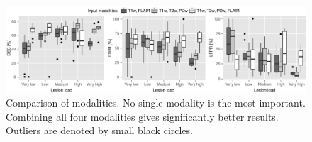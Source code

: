 
% 
% 

\begin{figure}
\centering
\includegraphics[width=\textwidth]{figures/modalities}
\caption{Comparison of modalities. No single modality is the most important.
Combining all four modalities gives significantly better results. Outliers are
denoted by small black circles.}
\end{figure}

